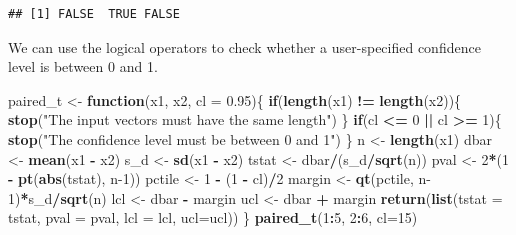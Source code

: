 \documentclass[
]{krantz}
\newenvironment{Shaded}{\begin{snugshade}}{\end{snugshade}}
\newcommand{\ControlFlowTok}[1]{\textcolor[rgb]{0.13,0.29,0.53}{\textbf{#1}}}
\newcommand{\DataTypeTok}[1]{\textcolor[rgb]{0.13,0.29,0.53}{#1}}
\newcommand{\DecValTok}[1]{\textcolor[rgb]{0.00,0.00,0.81}{#1}}
\newcommand{\FloatTok}[1]{\textcolor[rgb]{0.00,0.00,0.81}{#1}}
\newcommand{\KeywordTok}[1]{\textcolor[rgb]{0.13,0.29,0.53}{\textbf{#1}}}
\newcommand{\NormalTok}[1]{#1}
\newcommand{\OperatorTok}[1]{\textcolor[rgb]{0.81,0.36,0.00}{\textbf{#1}}}
\newcommand{\StringTok}[1]{\textcolor[rgb]{0.31,0.60,0.02}{#1}}
\begin{document}
\begin{verbatim}
## [1] FALSE  TRUE FALSE
\end{verbatim}

We can use the logical operators to check whether a user-specified confidence level is between 0 and 1.

\begin{Shaded}
\begin{Highlighting}[]
\NormalTok{paired\_t \textless{}{-}}\StringTok{ }\ControlFlowTok{function}\NormalTok{(x1, x2, }\DataTypeTok{cl =} \FloatTok{0.95}\NormalTok{)\{}
    \ControlFlowTok{if}\NormalTok{(}\KeywordTok{length}\NormalTok{(x1) }\OperatorTok{!=}\StringTok{ }\KeywordTok{length}\NormalTok{(x2))\{}
        \KeywordTok{stop}\NormalTok{(}\StringTok{"The input vectors  must have the same length"}\NormalTok{)}
\NormalTok{    \}}
    \ControlFlowTok{if}\NormalTok{(cl }\OperatorTok{\textless{}=}\StringTok{ }\DecValTok{0} \OperatorTok{||}\StringTok{ }\NormalTok{cl }\OperatorTok{\textgreater{}=}\StringTok{ }\DecValTok{1}\NormalTok{)\{}
        \KeywordTok{stop}\NormalTok{(}\StringTok{"The confidence level must be between 0 and 1"}\NormalTok{)}
\NormalTok{    \}}
\NormalTok{    n \textless{}{-}}\StringTok{ }\KeywordTok{length}\NormalTok{(x1)}
\NormalTok{    dbar \textless{}{-}}\StringTok{ }\KeywordTok{mean}\NormalTok{(x1 }\OperatorTok{{-}}\StringTok{ }\NormalTok{x2)}
\NormalTok{    s\_d \textless{}{-}}\StringTok{ }\KeywordTok{sd}\NormalTok{(x1 }\OperatorTok{{-}}\StringTok{ }\NormalTok{x2)}
\NormalTok{    tstat \textless{}{-}}\StringTok{ }\NormalTok{dbar}\OperatorTok{/}\NormalTok{(s\_d}\OperatorTok{/}\KeywordTok{sqrt}\NormalTok{(n))}
\NormalTok{    pval \textless{}{-}}\StringTok{ }\DecValTok{2}\OperatorTok{*}\NormalTok{(}\DecValTok{1} \OperatorTok{{-}}\StringTok{ }\KeywordTok{pt}\NormalTok{(}\KeywordTok{abs}\NormalTok{(tstat), n}\DecValTok{{-}1}\NormalTok{))}
\NormalTok{    pctile \textless{}{-}}\StringTok{ }\DecValTok{1} \OperatorTok{{-}}\StringTok{ }\NormalTok{(}\DecValTok{1} \OperatorTok{{-}}\StringTok{ }\NormalTok{cl)}\OperatorTok{/}\DecValTok{2}
\NormalTok{    margin \textless{}{-}}\StringTok{ }\KeywordTok{qt}\NormalTok{(pctile, n}\DecValTok{{-}1}\NormalTok{)}\OperatorTok{*}\NormalTok{s\_d}\OperatorTok{/}\KeywordTok{sqrt}\NormalTok{(n)}
\NormalTok{    lcl \textless{}{-}}\StringTok{ }\NormalTok{dbar }\OperatorTok{{-}}\StringTok{ }\NormalTok{margin}
\NormalTok{    ucl \textless{}{-}}\StringTok{ }\NormalTok{dbar }\OperatorTok{+}\StringTok{ }\NormalTok{margin}
    \KeywordTok{return}\NormalTok{(}\KeywordTok{list}\NormalTok{(}\DataTypeTok{tstat =}\NormalTok{ tstat, }\DataTypeTok{pval =}\NormalTok{ pval, }\DataTypeTok{lcl =}\NormalTok{ lcl, }\DataTypeTok{ucl=}\NormalTok{ucl))}
\NormalTok{\}}
\KeywordTok{paired\_t}\NormalTok{(}\DecValTok{1}\OperatorTok{:}\DecValTok{5}\NormalTok{, }\DecValTok{2}\OperatorTok{:}\DecValTok{6}\NormalTok{, }\DataTypeTok{cl=}\DecValTok{15}\NormalTok{)}
\end{Highlighting}
\end{Shaded}
\end{document}
